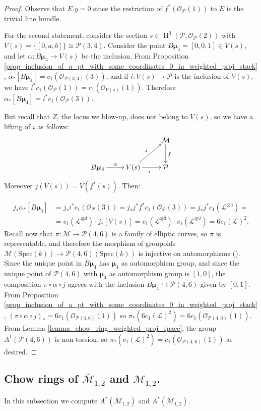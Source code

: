 \documentclass[11pt]{amsart}
\theoremstyle{definition}
\theoremstyle{remark}
\newcommand{\calO}{\mathcal O}
\newcommand{\calM}{\mathcal M}
\newcommand{\calL}{\mathcal L}
\newcommand{\calP}{\mathcal P}
\newcommand{\bmu}{\boldsymbol{\mu}}
\newcommand{\Spec}{\mathrm{Spec}}
\begin{document}
\begin{proof}
Observe that $E.y = 0$ since the restriction of $f^*(\calO_\calP(1))$ to $E$ is the trivial line bundle.

For the second statement, consider the section $s \in \operatorname{H}^0(\calP, \calO_\calP(2))$ with $V(s) = \{[0,a,b]\}\cong \calP(3,4)$. Consider the point $B\bmu_4 = [0,0,1] \in V(s)$, and let $\alpha:B\bmu_4\to V(s)$ be the inclusion.
From Proposition \ref{prop_inclusion_of_a_pt_with_some_coordinates_0_in_weighted_proj_stack}, $\alpha_*[B\bmu_4] = c_1(\calO_{\calP(3,4)}(3))$, and if $i:V(s)\to \calP$ is the inclusion of $V(s)$, we have $i^*c_1(\calO_\calP(1)) = c_1(\calO_{V(s)}(1))$. Therefore
$\alpha_*[B\bmu_4] = i^*c_1(\calO_\calP(3)).$


But recall that $Z$, the locus we blow-up, does not belong to $V(s)$, so we have a lifting of $i$ as follows:
$$\xymatrix{& & \calM\ar[d]^{f} \\
B\bmu_4 \ar[r]^{\alpha}& V(s)\ar[r]_i \ar[ur]^j &\calP}$$
Moreover $j(V(s)) = V(f^*(s))$. Then:

\begin{align*}
j_*\alpha_*[B\bmu_4] & = j_*i^* c_1(\calO_\calP(3))= j_*j^* f^*c_1(\calO_\calP(3))
= j_*j^* c_1(\calL^{\otimes 3}) = \\ &= c_1(\calL^{\otimes 3})\cdot j_*[V(s)]   = c_1(\calL^{\otimes 3})  \cdot c_1(\calL^{\otimes 2}) = 6 c_1(\calL)^2.
\end{align*}
Recall now that $\pi:\calM \to \calP(4,6)$ is a family of elliptic curves, so $\pi$ is representable, and therefore the morphism of groupoids $\calM(\Spec(k))\to \calP(4,6)(\Spec(k))$ is injective on automorphisms (\cite[Lemma 2.3.9]{AH}). Since the unique point in $B\bmu_4$ has $\bmu_4$ as automorphism group, and since the unique point of $\calP(4,6)$ with $\bmu_4$ as automorphism group is $[1,0]$, the composition
$\pi\circ \alpha \circ j$ agrees with the inclusion $B\bmu_4\hookrightarrow \calP(4,6)$ given by $[0,1]$. From Proposition \ref{prop_inclusion_of_a_pt_with_some_coordinates_0_in_weighted_proj_stack}, $(\pi\circ \alpha \circ j)_* = 6c_1(\calO_{\calP(4,6)}(1))$ so $\pi_*(6c_1(\calL)^2) = 6c_1(\calO_{\calP(4,6)}(1))$. From Lemma \ref{lemma_chow_ring_weighted_proj_space}, the group $A^1(\calP(4,6))$ is non-torsion, so $\pi_*(c_1(\calL)^2) = c_1(\calO_{\calP(4,6)}(1))$ as desired.
\end{proof}

\subsection{Chow rings of $\overline{\calM}_{1,2}$ and $\calM_{1,2}$.}\label{subsection_chow_ring_m12}In this subsection we compute $A^*(\overline{\calM}_{1,2})$ and $A^*(\calM_{1,2})$.
\end{document}

